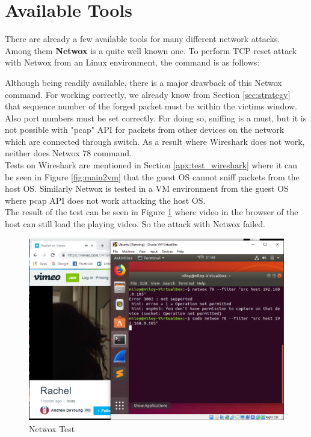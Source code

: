 \documentclass[14pt]{extarticle}
\begin{document}
\section{Available Tools}
    \label{sec:netwox}
    There are already a few available tools for many different network attacks. Among them \textbf{Netwox} is a quite well known one. To perform TCP reset attack with Netwox from an Linux environment, the command is as follows:
    
    
    
    Although being readily available, there is a major drawback of this Netwox command. For working correctly, we already know from Section \ref{sec:strategy} that sequence number of the forged packet must be within the victims window. Also port numbers must be set correctly. For doing so, sniffing is a must, but it is not possible with "pcap" API for packets from other devices on the network which are connected through switch. As a result where Wireshark does not work, neither does Netwox 78 command. \\ 
    Tests on Wireshark are mentioned in Section \ref{apx:test_wireshark} where it can be seen in Figure \ref{fig:main2vm} that the guest OS cannot sniff packets from the host OS. Similarly Netwox is tested in a VM environment from the guest OS where pcap API does not work attacking the host OS. \\
    The result of the test can be seen in Figure \ref{fig:netwox_test} where video in the browser of the host can still load the playing video. So the attack with Netwox failed.
    
    \begin{figure}
    	\centering
    	\includegraphics[width=.95\textwidth]{Pictures/Netwox_test.png}
    	\caption{Netwox Test} 
    	\label{fig:netwox_test}
    \end{figure}
    
\end{document}
